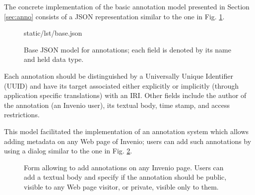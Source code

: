 
The concrete implementation of the basic annotation model presented in
Section \ref{sec:anno} consists of a JSON representation similar to the one
in Fig. \ref{lst:basejson}.

\begin{figure}[!ht]
  
    {static/lst/base.json}
  \caption[Base JSON model for annotations]
          {Base JSON model for annotations; each field is denoted by its name
           and held data type.}
  \label{lst:basejson}
\end{figure}

Each annotation should be distinguished by a Universally Unique Identifier
(UUID) and have its target associated either explicitly or implicitly (through
application specific translations) with an IRI. Other fields include the author
of the annotation (an Invenio user), its textual body, time stamp, and access
restrictions.

This model facilitated the implementation of an annotation system which allows
adding metadata on any Web page of Invenio; users can add such annotations by
using a dialog similar to the one in Fig. \ref{fig:annoform}.

\begin{figure}
  \centering
  \caption[Form allowing to add annotations on any Invenio page]
          {Form allowing to add annotations on any Invenio page. Users can add
           a textual body and specify if the annotation should be public,
           visible to any Web page visitor, or private, visible only to them.}
  \label{fig:annoform}
\end{figure}

